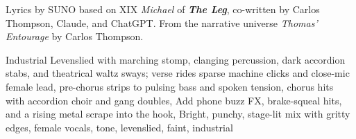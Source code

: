 
\begin{notes}
Lyrics by SUNO based on XIX \emph{Michael} of \emph{\bfseries The Leg}, %
co-written by Carlos Thompson, Claude, and ChatGPT. %
From the narrative universe \emph{Thomas’ Entourage} by Carlos Thompson.
\end{notes}
\begin{style}
Industrial Levenslied with marching stomp, clanging percussion, dark accordion stabs, and theatrical waltz sways; verse rides sparse machine clicks and close-mic female lead, pre-chorus strips to pulsing bass and spoken tension, chorus hits with accordion choir and gang doubles, Add phone buzz FX, brake-squeal hits, and a rising metal scrape into the hook, Bright, punchy, stage-lit mix with gritty edges, female vocals, tone, levenslied, faint, industrial
\end{style}
